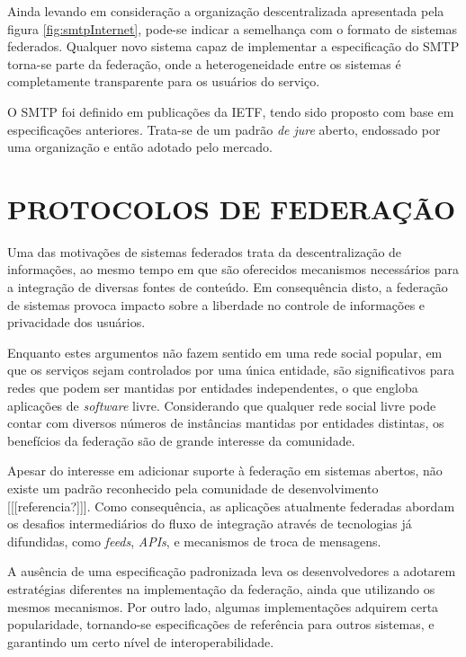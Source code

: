 Ainda levando em consideração a organização descentralizada apresentada pela figura
\ref{fig:smtpInternet}, pode-se indicar a semelhança com o formato de sistemas
federados. Qualquer novo sistema capaz de implementar a especificação do SMTP
torna-se parte da federação, onde a heterogeneidade entre os sistemas é
completamente transparente para os usuários do serviço.

O SMTP foi definido em publicações da IETF, tendo sido proposto com base em
especificações anteriores. Trata-se de um padrão \textit{de jure} aberto, endossado
por uma organização e então adotado pelo mercado.

\section{PROTOCOLOS DE FEDERAÇÃO}



Uma das motivações de sistemas federados trata da descentralização de informações,
ao mesmo tempo em que são oferecidos mecanismos necessários para a integração de
diversas fontes de conteúdo. Em consequência disto, a federação de sistemas provoca
impacto sobre a liberdade no controle de informações e privacidade dos usuários.

Enquanto estes argumentos não fazem sentido em uma rede social popular, em que os
serviços sejam controlados por uma única entidade, são significativos para redes que
podem ser mantidas por entidades independentes, o que engloba aplicações de
\textit{software} livre. Considerando que qualquer rede social livre pode contar com
diversos números de instâncias mantidas por entidades distintas, os benefícios da
federação são de grande interesse da comunidade.

Apesar do interesse em adicionar suporte à federação em sistemas abertos, não existe
um padrão reconhecido pela comunidade de desenvolvimento [[[referencia?]]]. Como
consequência, as aplicações atualmente federadas abordam os desafios intermediários
do fluxo de integração através de tecnologias já difundidas, como \textit{feeds},
\textit{APIs}, e mecanismos de troca de mensagens.

A ausência de uma especificação padronizada leva os desenvolvedores a adotarem
estratégias diferentes na implementação da federação, ainda que utilizando os mesmos
mecanismos. Por outro lado, algumas implementações adquirem certa popularidade,
tornando-se especificações de referência para outros sistemas, e garantindo um certo
nível de interoperabilidade.


